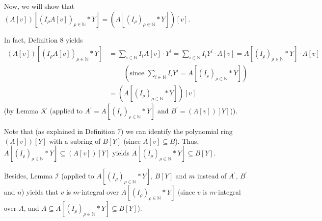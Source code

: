 \documentclass[12pt,final,notitlepage,onecolumn]{article}%
\begin{document}
Now, we will show that $\left(  A\left[  v\right]  \right)  \left[  \left(
I_{\rho}A\left[  v\right]  \right)  _{\rho\in\mathbb{N}}\ast Y\right]
=\left(  A\left[  \left(  I_{\rho}\right)  _{\rho\in\mathbb{N}}\ast Y\right]
\right)  \left[  v\right]  $.

In fact, Definition 8 yields%
\begin{align*}
\left(  A\left[  v\right]  \right)  \left[  \left(  I_{\rho}A\left[  v\right]
\right)  _{\rho\in\mathbb{N}}\ast Y\right]   &  =\sum\limits_{i\in\mathbb{N}%
}I_{i}A\left[  v\right]  \cdot Y^{i}=\sum\limits_{i\in\mathbb{N}}I_{i}%
Y^{i}\cdot A\left[  v\right]  =A\left[  \left(  I_{\rho}\right)  _{\rho
\in\mathbb{N}}\ast Y\right]  \cdot A\left[  v\right] \\
&  \ \ \ \ \ \ \ \ \ \ \left(  \text{since }\sum\limits_{i\in\mathbb{N}}%
I_{i}Y^{i}=A\left[  \left(  I_{\rho}\right)  _{\rho\in\mathbb{N}}\ast
Y\right]  \right) \\
&  =\left(  A\left[  \left(  I_{\rho}\right)  _{\rho\in\mathbb{N}}\ast
Y\right]  \right)  \left[  v\right]
\end{align*}
(by Lemma $\mathcal{K}$ (applied to $A^{\prime}=A\left[  \left(  I_{\rho
}\right)  _{\rho\in\mathbb{N}}\ast Y\right]  $ and $B^{\prime}=\left(
A\left[  v\right]  \right)  \left[  Y\right]  $)).

Note that (as explained in Definition 7) we can identify the polynomial ring
$\left(  A\left[  v\right]  \right)  \left[  Y\right]  $ with a subring of
$B\left[  Y\right]  $ (since $A\left[  v\right]  \subseteq B$). Thus,
$A\left[  \left(  I_{\rho}\right)  _{\rho\in\mathbb{N}}\ast Y\right]
\subseteq\left(  A\left[  v\right]  \right)  \left[  Y\right]  $ yields
$A\left[  \left(  I_{\rho}\right)  _{\rho\in\mathbb{N}}\ast Y\right]
\subseteq B\left[  Y\right]  $.

Besides, Lemma $\mathcal{I}$ (applied to $A\left[  \left(  I_{\rho}\right)
_{\rho\in\mathbb{N}}\ast Y\right]  $, $B\left[  Y\right]  $ and $m$ instead of
$A^{\prime}$, $B^{\prime}$ and $n$) yields that $v$ is $m$-integral over
$A\left[  \left(  I_{\rho}\right)  _{\rho\in\mathbb{N}}\ast Y\right]  $ (since
$v$ is $m$-integral over $A$, and $A\subseteq A\left[  \left(  I_{\rho
}\right)  _{\rho\in\mathbb{N}}\ast Y\right]  \subseteq B\left[  Y\right]  $).
\end{document}
